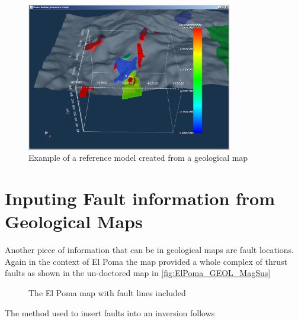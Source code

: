 \begin{figure} [h]
    \centering
    \includegraphics[width=0.8\textwidth]{images/MaptoModel/mapRefModPlan.PNG}
    \caption{Example of a reference model created from a geological map}
    \label{fig:mapRefModPlan}
\end{figure}

\section{Inputing Fault information from Geological Maps}
\label{sec:Inputing Fault information from Geological Maps}

Another piece of information that can be in geological maps are fault locations. Again in the context of El Poma the map provided a whole complex of thrust faults as shown in the un-doctored map in \autoref{fig:ElPoma_GEOL_MagSus}
\begin{figure} [h]
    \centering
    \caption{The El Poma map with fault lines included}
    \label{fig:ElPoma_GEOL_MagSus}
\end{figure}
\FloatBarrier
The method used to insert faults into an inversion follows

